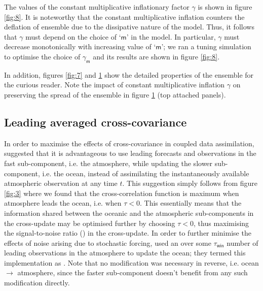 \documentclass[a4paper,10pt]{article}
\begin{document}
\begin{multicols}{2}
\begin{figure}[H]
\label{fig:9}
\end{figure}
{\noindent}The values of the constant multiplicative inflationary factor $\gamma$ is shown in figure \ref{fig:8}. It is noteworthy that the constant multiplicative inflation counters the deflation of ensemble due to the dissipative nature of the model. Thus, it follows that $\gamma$ must depend on the choice of `$\mathsf{m}$' in the model. In particular, $\gamma$ must decrease monotonically with increasing value of `$\mathsf{m}$'; we ran a tuning simulation to optimise the choice of $\gamma_\mathsf{m}$ and its results are shown in figure \ref{fig:8}. 

In addition, figures \ref{fig:7} and \ref{fig:9} show the detailed properties of the ensemble for the curious reader. Note the impact of constant multiplicative inflation $\gamma$ on preserving the spread of the ensemble in figure \ref{fig:9} (top attached panels).  
\subsection{Leading averaged cross-covariance}
\label{sec:LACC}
{\noindent}In order to maximise the effects of cross-covariance in coupled data assimilation, \citet{lu2015a, lu2015b} suggested that it is advantageous to use leading forecasts and observations in the fast sub-component, i.e. the atmosphere, while updating the slower sub-component, i.e. the ocean, instead of assimilating the instantaneously available atmospheric observation at any time $t$. This suggestion simply follows from figure \ref{fig:3} where we found that the cross-correlation function is maximum when atmosphere leads the ocean, i.e. when $\tau < 0$. This essentially means that the information shared between the oceanic and the atmospheric sub-components in the cross-update may be optimised further by choosing $\tau < 0$, thus maximising the signal-to-noise ratio ({\snr}) in the cross-update. In order to further minimise the effects of noise arising due to stochastic forcing, \citet{lu2015a} used an  over some $\tau_\mathsf{win}$ number of leading observations in the atmosphere to update the ocean; they termed this implementation as {\lacc} \citep{lu2015a, lu2015b}. Note that no modification was necessary in reverse, i.e. ocean $\rightarrow$ atmosphere, since the faster sub-component doesn't benefit from any such modification directly. 


\end{multicols}
\end{document}
